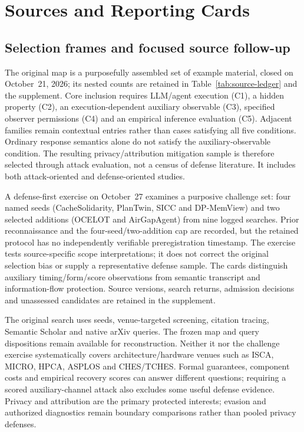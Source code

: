 \section{Sources and Reporting Cards}\label{sec:methodology}\label{sec:background}
\subsection{Selection frames and focused source follow-up}
The original map is a purposefully assembled set of example material, closed on October~21, 2026; its nested counts are retained in Table~\ref{tab:source-ledger} and the supplement. Core inclusion requires LLM/agent execution (C1), a hidden property (C2), an execution-dependent auxiliary observable (C3), specified observer permissions (C4) and an empirical inference evaluation (C5). Adjacent families remain contextual entries rather than cases satisfying all five conditions. Ordinary response semantics alone do not satisfy the auxiliary-observable condition. The resulting privacy/attribution mitigation sample is therefore selected through attack evaluation, not a census of defense literature. It includes both attack-oriented and defense-oriented studies.

A defense-first exercise on October~27 examines a purposive challenge set: four named seeds (CacheSolidarity, PlanTwin, SICC and DP-MemView) and two selected additions (OCELOT and AirGapAgent) from nine logged searches. Prior reconnaissance and the four-seed/two-addition cap are recorded, but the retained protocol has no independently verifiable preregistration timestamp. The exercise tests source-specific scope interpretations; it does not correct the original selection bias or supply a representative defense sample. The cards distinguish auxiliary timing/form/score observations from semantic transcript and information-flow protection. Source versions, search returns, admission decisions and unassessed candidates are retained in the supplement.

The original search uses seeds, venue-targeted screening, citation tracing, Semantic Scholar and native arXiv queries. The frozen map and query dispositions remain available for reconstruction. Neither it nor the challenge exercise systematically covers architecture/hardware venues such as ISCA, MICRO, HPCA, ASPLOS and CHES/TCHES. Formal guarantees, component costs and empirical recovery scores can answer different questions; requiring a scored auxiliary-channel attack also excludes some useful defense evidence. Privacy and attribution are the primary protected interests; evasion and authorized diagnostics remain boundary comparisons rather than pooled privacy defenses.

